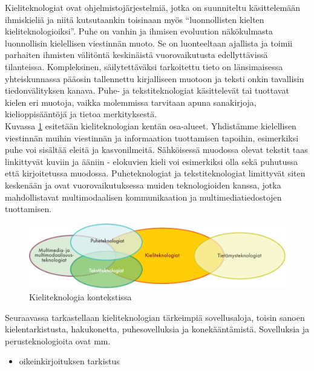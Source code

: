 \begin{multicols}{2}
Kieliteknologiat ovat ohjelmistojärjestelmiä, jotka on suunniteltu
käsittelemään ihmiskieliä ja niitä kutsutaankin toisinaan myös
“luonnollisten kielten kieliteknologioiksi”. Puhe on vanhin ja ihmisen 
evoluution näkökulmasta luonnollisin kielellisen viestinnän muoto. Se on 
luonteeltaan ajallista ja toimii parhaiten 
ihmisten välitöntä keskinäistä vuorovaikutusta edellyttävissä tilanteissa. 
Kompleksinen, säilytettäväksi tarkoitettu tieto on länsimaisessa yhteiskunnassa
pääosin tallennettu kirjalliseen muotoon ja teksti onkin tavallisin
tiedonvälityksen kanava. Puhe- ja tekstiteknologiat käsittelevät tai
tuottavat kielen eri muotoja, vaikka molemmissa tarvitaan apuna
sanakirjoja, kielioppisääntöjä ja tietoa merkityksestä.\\
Kuvassa \ref{fig:ltincontext-fin} esitetään kieliteknologian kentän
osa-alueet.  Yhdistämme kielellisen viestinnän muihin viestinnän ja
informaation tuottamisen tapoihin, esimerkiksi puhe voi sisältää
eleitä ja kasvonilmeitä. Sähköisessä muodossa olevat tekstit taas
linkittyvät kuviin ja ääniin - elokuvien kieli voi esimerkiksi olla
sekä puhutussa että kirjoitetussa muodossa. Puheteknologiat ja
tekstiteknologiat limittyvät siten keskenään ja ovat
vuorovaikutuksessa muiden teknologioiden kanssa, jotka mahdollistavat
multimodaalisen kommunikaation ja multimediatiedostojen tuottamisen.

\begin{figure}[htb]
  \center
  \includegraphics[width=\textwidth]{../_media/finnish/language_technologies}
  \caption{Kieliteknologia kontekstissa}
  \label{fig:ltincontext-fin}
\end{figure}

Seuraavassa tarkastellaan kieliteknologian tärkeimpiä sovellusaloja,
toisin sanoen kielentarkistusta, hakukonetta, puhesovelluksia ja
konekääntämistä.  Sovelluksia ja perusteknologioita ovat mm.
\begin{itemize}
\item oikeinkirjoituksen tarkistus


\end{itemize}
\end{multicols}
